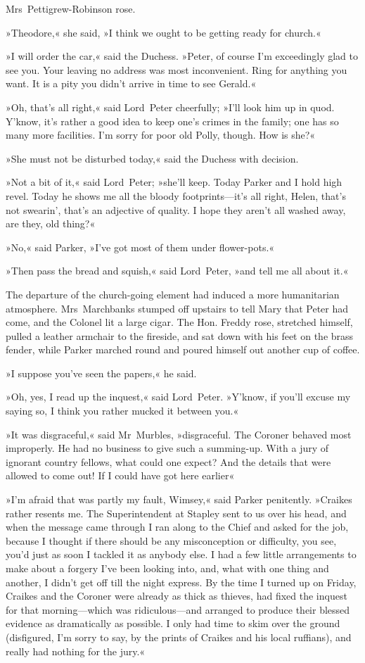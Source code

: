 Mrs~Pettigrew-Robinson rose.

»Theodore,« she said, »I think we ought to be getting ready for church.«

»I will order the car,« said the Duchess. »Peter, of course I'm exceedingly glad to see you. Your leaving no address was most inconvenient. Ring for anything you want. It is a pity you didn't arrive in time to see Gerald.«

»Oh, that's all right,« said Lord~Peter cheerfully; »I'll look him up in quod. Y'know, it's rather a good idea to keep one's crimes in the family; one has so many more facilities. I'm sorry for poor old Polly, though. How is she?«

»She must not be disturbed today,« said the Duchess with decision.

»Not a bit of it,« said Lord~Peter; »she'll keep. Today Parker and I hold high revel. Today he shows me all the bloody footprints—it's all right, Helen, that's not swearin', that's an adjective of quality. I hope they aren't all washed away, are they, old thing?«

»No,« said Parker, »I've got most of them under flower-pots.«

»Then pass the bread and squish,« said Lord~Peter, »and tell me all about it.«

The departure of the church-going element had induced a more humanitarian atmosphere. Mrs~Marchbanks stumped off upstairs to tell Mary that Peter had come, and the Colonel lit a large cigar. The Hon.  Freddy rose, stretched himself, pulled a leather armchair to the fireside, and sat down with his feet on the brass fender, while Parker marched round and poured himself out another cup of coffee.

»I suppose you've seen the papers,« he said.

»Oh, yes, I read up the inquest,« said Lord~Peter. »Y'know, if you'll excuse my saying so, I think you rather mucked it between you.«

»It was disgraceful,« said Mr~Murbles, »disgraceful. The Coroner behaved most improperly. He had no business to give such a summing-up.  With a jury of ignorant country fellows, what could one expect? And the details that were allowed to come out! If I could have got here earlier\longdash«

»I'm afraid that was partly my fault, Wimsey,« said Parker penitently. »Craikes rather resents me. The Superintendent at Stapley sent to us over his head, and when the message came through I ran along to the Chief and asked for the job, because I thought if there should be any misconception or difficulty, you see, you'd just as soon I tackled it as anybody else. I had a few little arrangements to make about a forgery I've been looking into, and, what with one thing and another, I didn't get off till the night express. By the time I turned up on Friday, Craikes and the Coroner were already as thick as thieves, had fixed the inquest for that morning—which was ridiculous—and arranged to produce their blessed evidence as dramatically as possible. I only had time to skim over the ground (disfigured, I'm sorry to say, by the prints of Craikes and his local ruffians), and really had nothing for the jury.«


